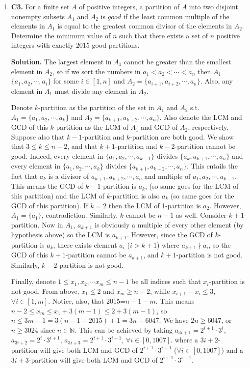 \documentclass[11pt,a4paper]{article}
\begin{document}
\begin{enumerate}
\item\textbf{C3.} For a finite set $A$ of positive integers, a partition of $A$ into two disjoint nonempty subsets $A_1$ and $A_2$ is $\textit{good}$ if the least common multiple of the elements in $A_1$ is equal to the greatest common divisor of the elements in $A_2$. Determine the minimum value of $n$ such that there exists a set of $n$ positive integers with exactly $2015$ good partitions.

\textbf{Solution.} The largest element in $A_1$ cannot be greater than the smallest element in $A_2$, so if we sort the numbers in $a_1<a_2<\cdots <a_n$ then $A_1$=$\{a_1,a_2,\cdots , a_i\}$ for some $i\in[1,n]$ and $A_2=\{a_{i+1}, a_{i+2},\cdots , a_n\}$. Also, any element in $A_1$ must divide any element in $A_2$. 

Denote $k$-partition as the partition of the set in $A_1$ and $A_2$ s.t. $A_1=\{a_1,a_2,\cdots , a_k\}$ and $A_2=\{a_{k+1}, a_{k+2},\cdots , a_n\}$. Also denote the LCM and GCD of this $k$-partition as the LCM of $A_1$ and GCD of $A_2$, respectively. Suppose also that $k-1$-partition and $k$-partition are both good. We show that $3\le k\le n-2$, and that $k+1$-partition and $k-2$-partition cannot be good. Indeed, every element in $\{a_1,a_2,\cdots , a_{k-1}\}$ divides $\{a_{k}, a_{k+1},\cdots , a_n\}$ and every element in $\{a_1,a_2,\cdots , a_k\}$ divides $\{a_{k+1}, a_{k+2},\cdots , a_n\}$. This entails the fact that $a_k$ is a divisor of $a_{k+1}, a_{k+2},\cdots , a_n$ and multiple of $a_1,a_2,\cdots , a_{k-1}$. This means the GCD of $k-1$-partition is $a_k$, (so same goes for the LCM of this partition) and the LCM of $k$-partition is also $a_k$ (so same goes for the GCD of this partition). If $k=2$ then the LCM of 1-partition is $a_2$. However, $A_1=\{a_1\}$, contradiction. Similarly, $k$ cannot be $n-1$ as well. Consider $k+1$-partition. Now in $A_1$, $a_{k+1}$ is obviously a multiple of every other element (by hypothesis above) so the LCM is $a_{k+1}$. However, since the GCD of $k$-partition is $a_k$, there exists element $a_i$ ($i>k+1$) where $a_{k+1}\nmid a_i$, so the GCD of this $k+1$-partition cannot be $a_{k+1}$, and $k+1$-partition is not good. Similarly, $k-2$-partition is not good.

Finally, denote $1\le x_1, x_2,\cdots x_m\le n-1$ be all indices such that $x_i$-partition is not good. From above, $x_1\le 2$ and $x_m\ge n-2$, while $x_{i+1}-x_{i}\le 3$, $\forall i\in [1,m]$. Notice, also, that 2015=$n-1-m$. This means $n-2\le x_m\le x_1+3(m-1)\le 2+3(m-1)$, so $n\le 3m+1=3(n-1-2015)+1=3n-6047$. We have $2n\ge 6047$, or $n\ge 3024$ since $n\in\mathbb{N}$. This can be achieved by taking $a_{3i+1}=2^{i+1}\cdot 3^{i}$, $a_{3i+2}=2^{i}\cdot 3^{i+1}$, $a_{3i+3}=2^{i+1}\cdot 3^{i+1}$, $\forall i\in[0,1007]$. where a $3i+2$-partition will give both LCM and GCD of $2^{i+1}\cdot 3^{i+1}$ ($\forall i\in [0,1007]$) and a $3i+3$-partition will give both LCM and GCD of $2^{i+1}\cdot 3^{i+1}$.


\end{enumerate}
\end{document}
